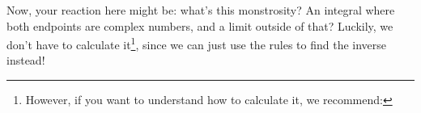 Now, your reaction here might be: what's this monstrosity? An integral where both endpoints are complex numbers, and a limit outside of that? Luckily, we don't have to calculate it\footnote{However, if you want to understand how to calculate it, we recommend: }, since we can just use the rules to find the inverse instead! 





\iffalse
If we define 
\begin{verbatim}
type TimeDomain      = Real
type FrequencyDomain = Complex
\end{verbatim}
then we can define the type of the Laplace transform accordingly: 
\begin{verbatim} 
laplace :: TimeDomain -> FrequencyDomain 
\end{verbatim}







\todo[inline,color=other]{introduce what a laplace transform is in words.
show how we construct it in a dsl. (show code)
some examples (just showing that the code works)
some examples from the book. as many different ones as possible, if some examples doesn't work with our code explain why.
}
\fi